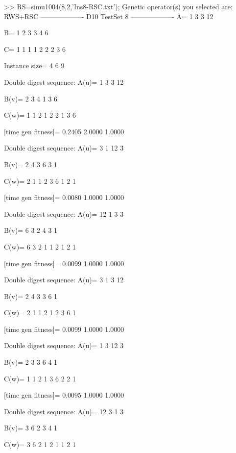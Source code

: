 >> RS=simu1004(8,2,'Ins8-RSC.txt');
Genetic operator(s) you selected are:
RWS+RSC
------------------- D10 TestSet 8 -------------------
A=
     1     3     3    12

B=
     1     2     3     3     4     6

C=
     1     1     1     1     2     2     2     3     6

Instance size=
     4     6     9

Double digest sequence:
A(u)=
     1     3     3    12

B(v)=
     2     3     4     1     3     6

C(w)=
     1     1     2     1     2     2     1     3     6

[time gen fitness]=
    0.2405    2.0000    1.0000

Double digest sequence:
A(u)=
     3     1    12     3

B(v)=
     2     4     3     6     3     1

C(w)=
     2     1     1     2     3     6     1     2     1

[time gen fitness]=
    0.0080    1.0000    1.0000

Double digest sequence:
A(u)=
    12     1     3     3

B(v)=
     6     3     2     4     3     1

C(w)=
     6     3     2     1     1     2     1     2     1

[time gen fitness]=
    0.0099    1.0000    1.0000

Double digest sequence:
A(u)=
     3     1     3    12

B(v)=
     2     4     3     3     6     1

C(w)=
     2     1     1     2     1     2     3     6     1

[time gen fitness]=
    0.0099    1.0000    1.0000

Double digest sequence:
A(u)=
     1     3    12     3

B(v)=
     2     3     3     6     4     1

C(w)=
     1     1     2     1     3     6     2     2     1

[time gen fitness]=
    0.0095    1.0000    1.0000

Double digest sequence:
A(u)=
    12     3     1     3

B(v)=
     3     6     2     3     4     1

C(w)=
     3     6     2     1     2     1     1     2     1


